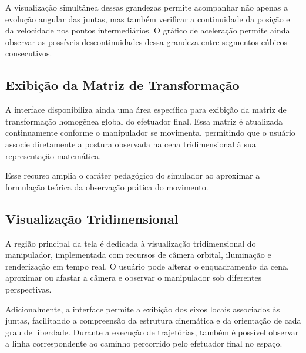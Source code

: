 A visualização simultânea dessas grandezas permite acompanhar não apenas a evolução angular das juntas, mas também verificar a continuidade da posição e da velocidade nos pontos intermediários. O gráfico de aceleração permite ainda observar as possíveis descontinuidades dessa grandeza entre segmentos cúbicos consecutivos.

\subsection{Exibição da Matriz de Transformação}

A interface disponibiliza ainda uma área específica para exibição da matriz de transformação homogênea global do efetuador final. Essa matriz é atualizada continuamente conforme o manipulador se movimenta, permitindo que o usuário associe diretamente a postura observada na cena tridimensional à sua representação matemática.

Esse recurso amplia o caráter pedagógico do simulador ao aproximar a formulação teórica da observação prática do movimento.

\subsection{Visualização Tridimensional}

A região principal da tela é dedicada à visualização tridimensional do manipulador, implementada com recursos de câmera orbital, iluminação e renderização em tempo real. O usuário pode alterar o enquadramento da cena, aproximar ou afastar a câmera e observar o manipulador sob diferentes perspectivas.

Adicionalmente, a interface permite a exibição dos eixos locais associados às juntas, facilitando a compreensão da estrutura cinemática e da orientação de cada grau de liberdade. Durante a execução de trajetórias, também é possível observar a linha correspondente ao caminho percorrido pelo efetuador final no espaço.
